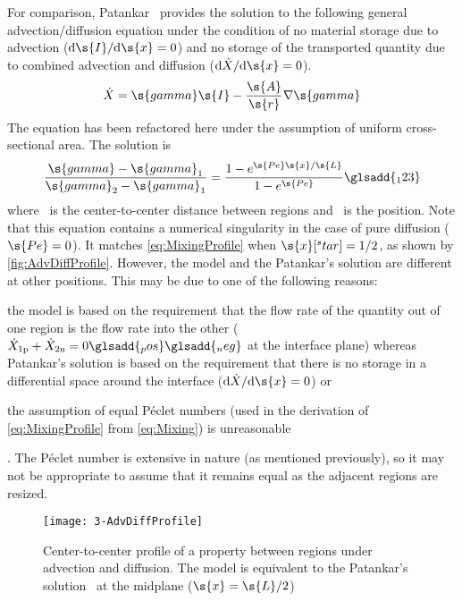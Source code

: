 For comparison, Patankar~\cite{Patankar1980} provides the solution to the following general advection\slash{}diffusion equation under the condition of no material storage due to advection ($\mathrm{d}\s{I}/\mathrm{d}\s{x} = 0$) and no storage of the transported quantity due to combined advection and diffusion ($\mathrm{d}\dot{X}/\mathrm{d}\s{x} = 0$).  
\begin{equation}
  \dot{X} = \s{gamma}\s{I} - \frac{\s{A}}{\s{r}}\nabla\s{gamma}
\end{equation}
The equation has been refactored here under the assumption of uniform cross-sectional area.  The solution is
\begin{equation}
  \label{eq:PropertyProfile}
  \frac{\s{gamma} - \s{gamma}_1}{\s{gamma}_2 - \s{gamma}_1} = \frac{1 - e^{\s{Pe}\s{x}/\s{L}}}{1 - e^{\s{Pe}}}
  \glsadd{_123}
\end{equation}
where ~is the center-to-center distance between regions and ~is the position.  Note that this equation contains a numerical singularity in the case of pure diffusion ($\s{Pe} = 0$).  It matches \autoref{eq:MixingProfile} when $\s{x}[^star] = 1/2$, as shown by \autoref{fig:AdvDiffProfile}.  However, the model and the Patankar's solution are different at other positions.  This may be due to one of the following reasons: \begin{inparaenum}[(1)] \item the model is based on the requirement that the flow rate of the quantity out of one region is the flow rate into the other ($\dot{X}_{1\text{p}} + \dot{X}_{2\text{n}} = 0\glsadd{_pos}\glsadd{_neg}$ at the interface plane) whereas Patankar's solution is based on the requirement that there is no storage in a differential space around the interface ($\mathrm{d}\dot{X}/\mathrm{d}\s{x} = 0$) or \item the assumption of equal P\'eclet numbers (used in the derivation of \autoref{eq:MixingProfile} from \autoref{eq:Mixing}) is unreasonable\end{inparaenum}.  The P\'eclet number is extensive in nature (as mentioned previously), so it may not be appropriate to assume that it remains equal as the adjacent regions are resized.

\begin{figure}[htb]
  \texttt{[image: 3-AdvDiffProfile]}%
  \caption[Profile of a property between regions due to advection and diffusion]{Center-to-center profile of a property between regions under advection and diffusion.  The model is equivalent to the Patankar's solution~\cite{Patankar1980} at the midplane ($\s{x} = \s{L}/2$)}%
  \label{fig:AdvDiffProfile}
\end{figure}

